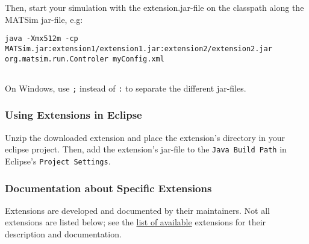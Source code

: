 Then, start your simulation with the extension.jar-file on the classpath along the MATSim jar-file, e.g:
\begin{verbatim}
java -Xmx512m -cp MATSim.jar:extension1/extension1.jar:extension2/extension2.jar org.matsim.run.Controler myConfig.xml


\end{verbatim}

On Windows, use 
\texttt{;} instead of 
\texttt{:} to separate the different jar-files.

\subsubsection{Using Extensions in Eclipse}

Unzip the downloaded extension and place the extension's directory in  your eclipse project. Then, add the extension's jar-file to the 
\texttt{Java Build Path} in Eclipse's 
\texttt{Project Settings}.

\subsubsection{Documentation about Specific Extensions}

Extensions are developed and documented by their maintainers. Not all extensions are listed below; see the \href{http://www.matsim.org/extensions}{list of available} extensions for their description and documentation.



\vfill\eject


\vfill\eject


\vfill\eject


\vfill\eject


\vfill\eject


\vfill\eject

